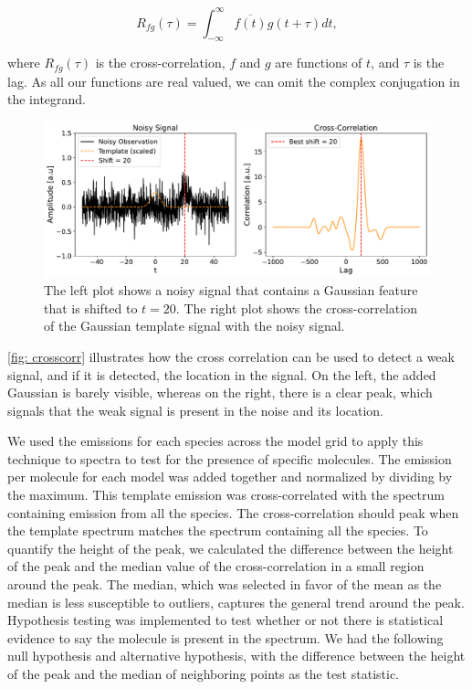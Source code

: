 \documentclass[oneside, single, authoryear, semicolon, 12pt]{lion-msc}
\newcommand{\4}{$_4$}
\newcommand{\3}{$_3$}
\newcommand{\2}{$_2$}
\begin{document}
\begin{equation}
    R_{fg}(\tau)=\int^\infty_{-\infty}\overline{f(t)}g(t+\tau)dt,
\end{equation}

where $R_{fg}(\tau)$ is the cross-correlation, $f$ and $g$ are functions of $t$, and $\tau$ is the lag. As all our functions are real valued, we can omit the complex conjugation in the integrand.

\begin{figure}[H]
    \centering
    \includegraphics[width=\linewidth]{Figures/Correlationexample.pdf}
    \caption{The left plot shows a noisy signal that contains a Gaussian feature that is shifted to $t=20$. The right plot shows the cross-correlation of the Gaussian template signal with the noisy signal.  }
    \label{fig: crosscorr vis}
\end{figure}

\autoref{fig: crosscorr} illustrates how the cross correlation can be used to detect a weak signal, and if it is detected, the location in the signal. On the left, the added Gaussian is barely visible, whereas on the right, there is a clear peak, which signals that the weak signal is present in the noise and its location.

We used the emissions for each species across the model grid to apply this technique to spectra to test for the presence of specific molecules. The emission per molecule for each model was added together and normalized by dividing by the maximum. This template emission was cross-correlated with the spectrum containing emission from all the species. The cross-correlation should peak when the template spectrum matches the spectrum containing all the species. To quantify the height of the peak, we calculated the difference between the height of the peak and the median value of the cross-correlation in a small region around the peak. The median, which was selected in favor of the mean as the median is less susceptible to outliers, captures the general trend around the peak. Hypothesis testing was implemented to test whether or not there is statistical evidence to say the molecule is present in the spectrum. We had the following null hypothesis and alternative hypothesis, with the difference between the height of the peak and the median of neighboring points as the test statistic.
\end{document}
